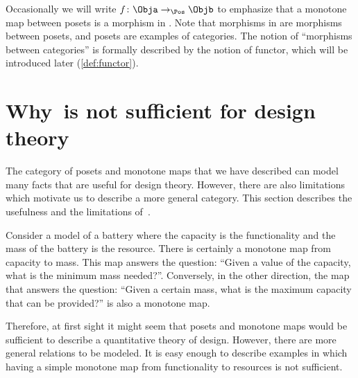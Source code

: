 Occasionally we will write $f \colon \Obja \to_{\Pos} \Objb$ to emphasize that a monotone map between posets is a morphism in \Pos. Note that morphisms in \Pos are morphisms between posets, and posets are examples of categories. The notion of ``morphisms between categories'' is formally described by the notion of functor, which will be introduced later (\cref{def:functor}).

\section{Why~\Pos is not sufficient for design theory}

The category \Pos of posets and monotone maps that we have described can model many facts that are useful for design theory. However, there are also limitations which motivate us to describe a more general category. This section describes the usefulness and the limitations of~\Pos.

\begin{example}[Battery]
  Consider a model of a battery where the capacity is the functionality and the mass of the battery is the resource.
  There is certainly a monotone map from capacity to mass. This map answers the question: ``Given a value of the capacity, what is the minimum mass needed?''. Conversely, in the other direction, the map that answers the question: ``Given a certain mass, what is the maximum capacity that can be provided?'' is also a monotone map.
\end{example}

\begin{comment}
  \begin{figure}[h!]
    \centering
    \begin{tikzcd}
      \bullet &\arrow[l] \bullet\\[-15pt]
      \text{mass} & \text{capacity}
    \end{tikzcd}
    \caption{Example of the design of a battery. }
    \label{fig:battery-example}
  \end{figure}
\end{comment}

Therefore, at first sight it might seem that posets and monotone maps would be sufficient to describe a quantitative theory of design. However, there are more general relations to be modeled. It is easy enough to describe examples in which having a simple monotone map from functionality to resources is not sufficient.

